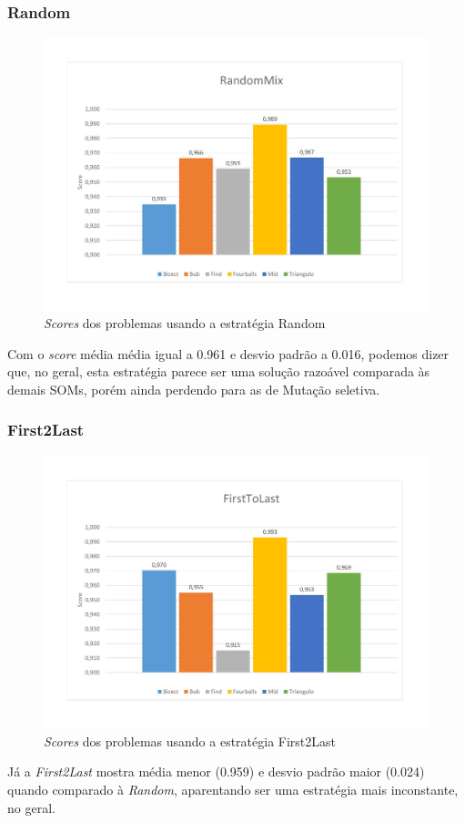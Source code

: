 \subsubsection{Random}
\begin{figure}[H]
\includegraphics[width=1\textwidth]{graficos/strategies/randommix.jpg}
\caption{\textit{Scores} dos problemas usando a estratégia Random}
\label{fig:Random}
\end{figure}
Com o \textit{score} média média igual a 0.961 e desvio padrão a 0.016, podemos dizer que, no geral, esta estratégia parece ser uma solução razoável comparada às demais SOMs, porém ainda perdendo para as de Mutação seletiva.

\subsubsection{First2Last}
\begin{figure}[H]
\includegraphics[width=1\textwidth]{graficos/strategies/firsttolast.jpg}
\caption{\textit{Scores} dos problemas usando a estratégia First2Last}
\label{fig:First2Last}
\end{figure}
Já a \textit{First2Last} mostra média menor (0.959) e desvio padrão maior (0.024) quando comparado à \textit{Random}, aparentando ser uma estratégia mais inconstante, no geral.

